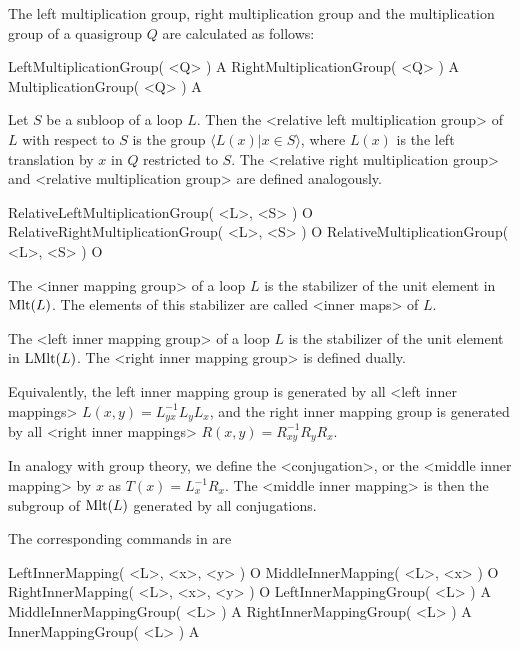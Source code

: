 The left multiplication group, right multiplication group and the
multiplication group of a quasigroup $Q$ are calculated as follows:

\>LeftMultiplicationGroup( <Q> ) A
\>RightMultiplicationGroup( <Q> ) A
\>MultiplicationGroup( <Q> ) A

Let $S$ be a subloop of a loop $L$. Then the <relative left multiplication
group> of $L$ with respect to $S$ is
the group $\langle L(x)|x\in S\rangle$, where $L(x)$ is the left translation by
$x$ in $Q$ restricted to $S$. The <relative right multiplication
group> and <relative multiplication
group>  are defined analogously.

\>RelativeLeftMultiplicationGroup( <L>, <S> ) O
\>RelativeRightMultiplicationGroup( <L>, <S> ) O
\>RelativeMultiplicationGroup( <L>, <S> ) O


The <inner mapping group> of a loop $L$ is the
stabilizer of the unit element in ${\rm{Mlt}}(L)$. The elements of this
stabilizer are called <inner maps> of $L$.

The <left inner mapping group> of a loop $L$ is
the stabilizer of the unit element in ${\rm{LMlt}}(L)$. The <right inner
mapping group> is defined dually.

Equivalently, the left inner mapping group is generated by all <left inner
mappings> $L(x,y) = L_{yx}^{-1}L_yL_x$, and the right
inner mapping group is generated by all <right inner mappings> $R(x,y) = R_{xy}^{-1}R_yR_x$.

In analogy with group theory, we define the <conjugation>,
or the <middle inner mapping> by $x$ as $T(x) =
L_x^{-1}R_x$. The <middle inner mapping> is then
the subgroup of ${\rm{Mlt}}(L)$ generated by all conjugations.

The corresponding commands in {\LOOPS} are

\>LeftInnerMapping( <L>, <x>, <y> ) O
\>MiddleInnerMapping( <L>, <x> ) O
\>RightInnerMapping( <L>, <x>, <y> ) O
\>LeftInnerMappingGroup( <L> ) A
\>MiddleInnerMappingGroup( <L> ) A
\>RightInnerMappingGroup( <L> ) A
\>InnerMappingGroup( <L> ) A

